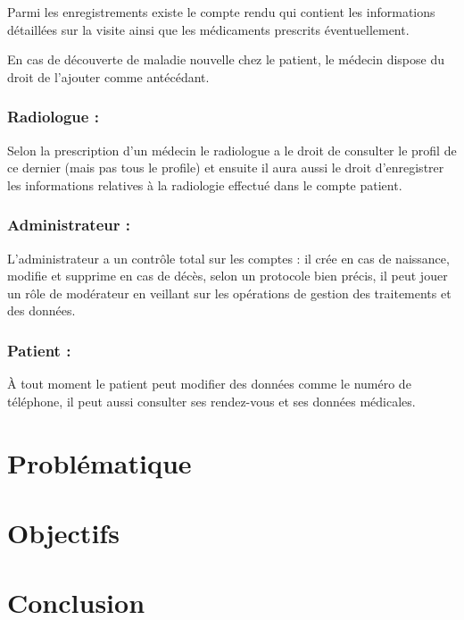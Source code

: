Parmi les enregistrements existe le compte rendu qui contient les informations détaillées sur la visite ainsi que les médicaments prescrits éventuellement. 

En cas de découverte de maladie nouvelle chez le patient, le médecin dispose du droit de l’ajouter comme antécédant. 

\subsubsection{Radiologue :} 

Selon la prescription d’un médecin le radiologue a le droit de consulter le profil de ce dernier (mais pas tous le profile) et ensuite il aura aussi le droit d’enregistrer les informations relatives à la radiologie effectué dans le compte patient. 

\subsubsection{Administrateur :}  

L’administrateur a un contrôle total sur les comptes : il crée en cas de naissance, modifie et supprime en cas de décès, selon un protocole bien précis, il peut jouer un rôle de modérateur en veillant sur les opérations de gestion des traitements et des données. 

\subsubsection{Patient :} 

À tout moment le patient peut modifier des données comme le numéro de téléphone, il peut aussi consulter ses rendez-vous et ses données médicales. 




\section{Problématique}


\section{Objectifs}


\section{Conclusion}